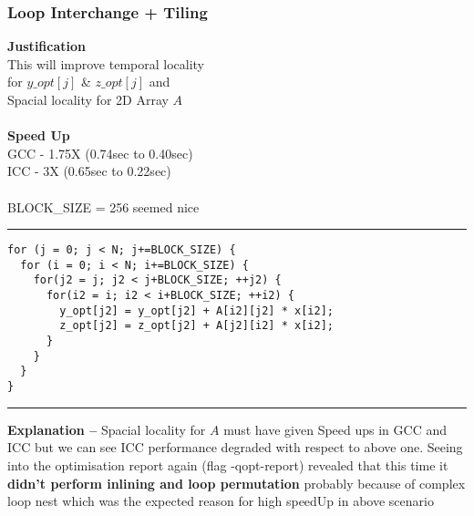 \documentclass[a4paper]{article}
\begin{document}
\subsubsection{\large\bf Loop Interchange + Tiling}
\begin{minipage}{0.4\textwidth}
{\bf Justification} \\
This will improve temporal locality  \\ for $y\_opt[j]$ \& $z\_opt[j]$  and \\
Spacial locality for 2D Array $A$\\ \\
{\bf Speed Up} \\
GCC - 1.75X (0.74sec to 0.40sec)\\ 
ICC - 3X (0.65sec to 0.22sec)\\ \\
BLOCK\_SIZE = 256 seemed nice
\end{minipage}
\begin{minipage}{0.6\textwidth}
\hrule
\begin{lstlisting}
for (j = 0; j < N; j+=BLOCK_SIZE) {
  for (i = 0; i < N; i+=BLOCK_SIZE) {
    for(j2 = j; j2 < j+BLOCK_SIZE; ++j2) {
      for(i2 = i; i2 < i+BLOCK_SIZE; ++i2) {
        y_opt[j2] = y_opt[j2] + A[i2][j2] * x[i2];
        z_opt[j2] = z_opt[j2] + A[j2][i2] * x[i2];
      }
    }
  }
}
\end{lstlisting}
\hrule 
\end{minipage}
\vspace{0.2cm}
\newline
{\bf Explanation -- } Spacial locality for $A$ must have given Speed ups in GCC and ICC but we can see ICC performance degraded with respect to above one. Seeing into the optimisation report again (flag -qopt-report) revealed that this time it {\bf didn't perform inlining and loop permutation} probably because of complex loop nest which was the expected reason for high speedUp in above scenario
\end{document}
